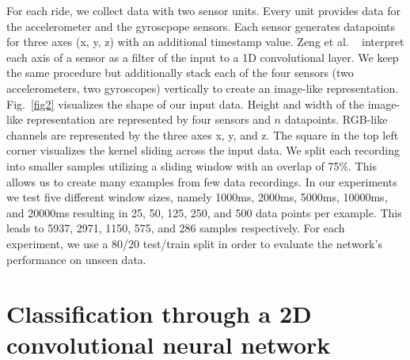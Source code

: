 \documentclass[runningheads]{llncs}
\begin{document}
For each ride, we collect data with two sensor units.
Every unit provides data for the accelerometer and the gyroscpope sensors.
Each sensor generates datapoints for three axes (x, y, z) with an additional timestamp value.
Zeng et al. ~\cite{zeng2014convolutional} interpret each axis of a sensor as a filter of the input to a 1D convolutional layer.
We keep the same procedure but additionally stack each of the four sensors (two accelerometers, two gyroscopes) vertically to create an image-like representation.
Fig.~\ref{fig2} visualizes the shape of our input data.
Height and width of the image-like representation are represented by four sensors and $n$ datapoints.
RGB-like channels are represented by the three axes x, y, and z.
The square in the top left corner visualizes the kernel sliding across the input data.
We split each recording into smaller samples utilizing a sliding window with an overlap of 75\%.
This allows us to create many examples from few data recordings.
In our experiments we test five different window sizes, namely 1000ms, 2000ms, 5000ms, 10000ms, and 20000ms resulting in 25, 50, 125, 250, and 500 data points per example.
This leads to 5937, 2971, 1150, 575, and 286 samples respectively.
For each experiment, we use a 80/20 test/train split in order to evaluate the network's performance on unseen data.

\section{Classification through a 2D convolutional neural network}
\end{document}
